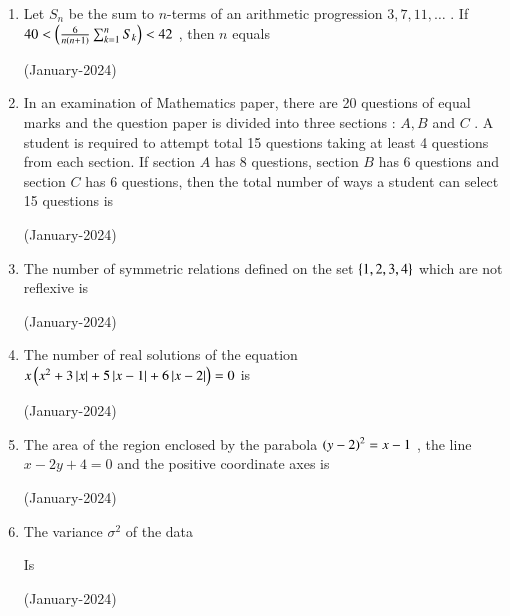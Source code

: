 \documentclass[journal]{IEEEtran}
\begin{document}
\begin{enumerate}
 \item Let $S_n$
 be the sum to $n$-terms of an arithmetic progression $3,7,11, \ldots $
 . If $40 < \left(\frac{6}{n(n+1)} \sum_{k = 1}^n S_k\right) < 42$
, then $n$
 equals 

 \hfill(January-2024)

 \item In an examination of Mathematics paper, there are 20 questions of equal marks and the question paper is divided into three sections : $A,B$
 and $C$
. A student is required to attempt total 15 questions taking at least 4 questions from each section. If section $A$
 has 8 questions, section $B$
 has 6 questions and section $C$
 has 6 questions, then the total number of ways a student can select 15 questions is 

 \hfill(January-2024)

 \item The number of symmetric relations defined on the set $\left\{1,2,3,4\right\}$
 which are not reflexive is 

 \hfill(January-2024)

 \item The number of real solutions of the equation $x\left(x^2 + 3\left\vert x\right\vert + 5\left\vert x-1\right\vert + 6 \left\vert x-2\right\vert\right) = 0$
 is 

 \hfill (January-2024)

 \item The area of the region enclosed by the parabola $\left(y-2\right)^2 = x -1 $
, the line $x - 2y + 4 = 0$
 and the positive coordinate axes is

 \hfill (January-2024)

 \item The variance $\sigma^2 $ of the data
 \begin{table}[h!]
     \centering
     
 \end{table} 
 
 Is

 \hfill (January-2024)
\end{enumerate}
\end{document}
